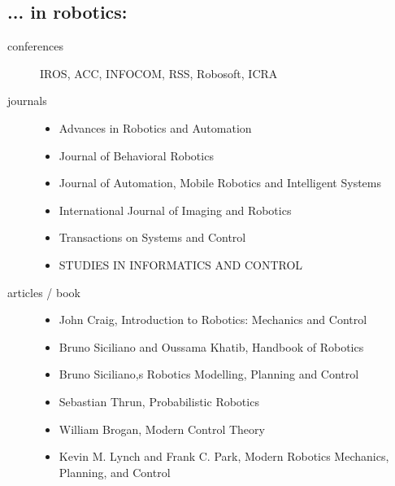 \documentclass{article}
\begin{document}
\subsection*{... in robotics:}
\begin{description}
    \item[conferences] IROS, ACC, INFOCOM, RSS, Robosoft, ICRA
    \item[journals] \hfill 
    \begin{itemize}
        \item Advances in Robotics and Automation
        \item Journal of Behavioral Robotics
        \item Journal of Automation, Mobile Robotics and Intelligent Systems
        \item International Journal of Imaging and Robotics
        \item Transactions on Systems and Control
        \item STUDIES IN INFORMATICS AND CONTROL
    \end{itemize}
        \item[articles / book] \hfill
        \begin{itemize}
            \item John Craig, Introduction to Robotics: Mechanics and Control
            \item Bruno Siciliano and Oussama Khatib, Handbook of Robotics 
            \item Bruno Siciliano,s Robotics Modelling, Planning and Control
            \item Sebastian Thrun, Probabilistic Robotics
            \item William Brogan, Modern Control Theory
            \item Kevin M. Lynch and Frank C. Park,  Modern Robotics Mechanics, Planning, and Control
        \end{itemize}  
    \end{description}
\end{document}
